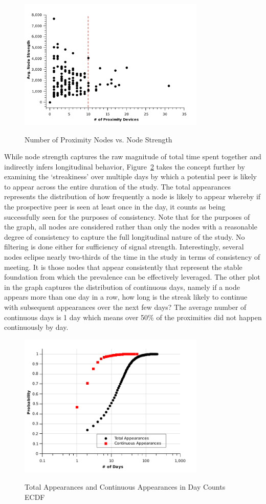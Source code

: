 \begin{figure}[tbp]
\centering 
{\includegraphics[width=3.5in]{graphs/node_strength_all_tag.pdf}}
\caption{Number of Proximity Nodes vs. Node Strength } 
\label{fig:node_strength_all}
\end{figure}

While node strength captures the raw magnitude of total time spent together and indirectly infers longitudinal behavior, Figure~\ref{fig:total_continuous_cdf} takes the concept further by examining the `streakiness' over multiple days by which a potential peer is likely to appear across the entire duration of the study. The total appearances represents the distribution of how frequently a node is likely to appear whereby if the prospective peer is seen at least once in the day, it counts as being successfully seen for the purposes of consistency. Note that for the purposes of the graph, all nodes are considered rather than only the nodes with a reasonable degree of consistency to capture the full longitudinal nature of the study. No filtering is done either for sufficiency of signal strength. Interestingly, several nodes eclipse nearly two-thirds of the time in the study in terms of consistency of meeting.  It is those nodes that appear consistently that represent the stable foundation from which the prevalence can be effectively leveraged.
The other plot in the graph captures the distribution of continuous days, namely if a node appears more than one day in a row, how long is the streak likely to continue with subsequent appearances over the next few days? The average number of continuous days is 1 day which means over 50\% of the proximities did not happen continuously by day.    

\begin{figure}[tbp]
\centering 
{\includegraphics[width=3.5in]{graphs/total_continuous_cdf.pdf}}
\caption{Total Appearances and Continuous Appearances in Day Counts ECDF}
\label{fig:total_continuous_cdf}
\end{figure}

